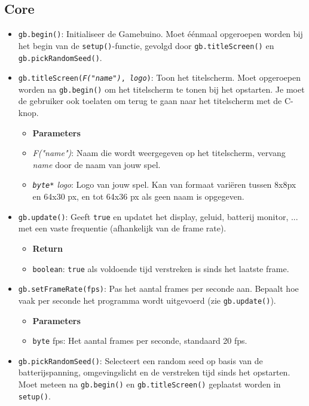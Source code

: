 \documentclass[a4paper,titlepage,12pt]{article}
\begin{document}
	\subsection{Core}
	\begin{itemize}
		\item \texttt{gb.begin()}:
		Initialiseer de Gamebuino. Moet éénmaal opgeroepen worden bij het begin van de \texttt{setup()}-functie, gevolgd door \texttt{gb.titleScreen()} en \texttt{gb.pickRandomSeed()}.
		
		\item \texttt{gb.titleScreen(\textit{F("name")}, \textit{logo})}:
		Toon het titelscherm. Moet opgeroepen worden na \texttt{gb.begin()} om het titelscherm te tonen bij het opstarten. Je moet de gebruiker ook toelaten om terug te gaan naar het titelscherm met de C-knop.
		\begin{itemize}
			\item [] \textbf{Parameters}
			\item \textit{F("name")}: Naam die wordt weergegeven op het titelscherm, vervang \textit{name} door de naam van jouw spel.
			\item \textit{\texttt{byte*} logo}: Logo van jouw spel. Kan van formaat variëren tussen 8x8px en 64x30 px, en tot 64x36 px als geen naam is opgegeven.
		\end{itemize}
	
		\item \samepage \texttt{gb.update()}:
		Geeft \texttt{true} en updatet het display, geluid, batterij monitor, ... met een vaste frequentie (afhankelijk van de frame rate).
		\begin{itemize}
			\item [] \textbf{Return}
			\item \texttt{boolean}: \texttt{true} als voldoende tijd verstreken is sinds het laatste frame.
		\end{itemize}
	
		\item \texttt{gb.setFrameRate(fps)}:
		Pas het aantal frames per seconde aan. Bepaalt hoe vaak per seconde het programma wordt uitgevoerd (zie \texttt{gb.update()}).
		\begin{itemize}
			\item [] \textbf{Parameters}
			\item \texttt{byte} fps: Het aantal frames per seconde, standaard 20 fps.
		\end{itemize}
	
		\item \texttt{gb.pickRandomSeed()}:
		Selecteert een random seed op basis van de batterijspanning, omgevingslicht en de verstreken tijd sinds het opstarten. Moet meteen na \texttt{gb.begin()} en \texttt{gb.titleScreen()} geplaatst worden in \texttt{setup()}.
		

\end{itemize}
\end{document}

